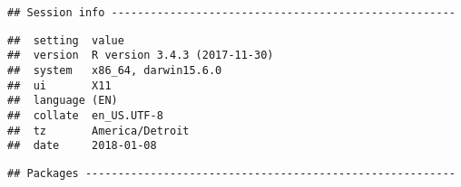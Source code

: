 \begin{Shaded}
\begin{Highlighting}[]
\OperatorTok{::}\NormalTok{(}\NormalTok{(}\NormalTok{, }\NormalTok{, }\NormalTok{))}
\end{Highlighting}
\end{Shaded}

\begin{verbatim}
## Session info -----------------------------------------------------
\end{verbatim}

\begin{verbatim}
##  setting  value                       
##  version  R version 3.4.3 (2017-11-30)
##  system   x86_64, darwin15.6.0        
##  ui       X11                         
##  language (EN)                        
##  collate  en_US.UTF-8                 
##  tz       America/Detroit             
##  date     2018-01-08
\end{verbatim}

\begin{verbatim}
## Packages ---------------------------------------------------------
\end{verbatim}

